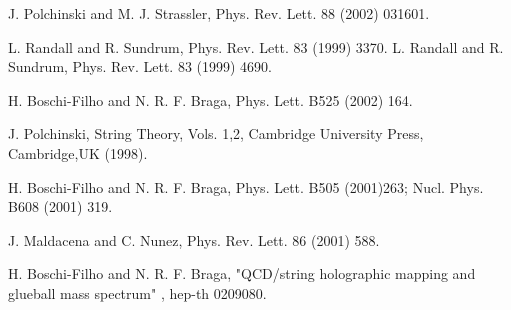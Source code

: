 \documentclass[a4paper,twocolumn,prd,groupedaddress,nofootinbib]{revtex4}
\begin{document}
\begin{thebibliography}{30}
 J. Polchinski and M. J. Strassler, Phys. Rev. Lett. 88 (2002) 031601.

 L. Randall and R. Sundrum, Phys. Rev. Lett. 83 (1999) 
3370.
 L. Randall and R. Sundrum, Phys. Rev. Lett. 83 (1999)
4690.

 H. Boschi-Filho and N. R. F. Braga, Phys. Lett. B525 (2002) 164.

 J. Polchinski, String Theory, Vols. 1,2, Cambridge University Press,
Cambridge,UK  (1998).

 H. Boschi-Filho and N. R. F. Braga, Phys. Lett. B505 (2001)263;
 Nucl. Phys. B608 (2001) 319.

 J. Maldacena and C. Nunez, Phys. Rev. Lett. 86 (2001) 588.

 H. Boschi-Filho and N. R. F. Braga, "QCD/string holographic 
mapping and glueball mass spectrum" , hep-th 0209080. 
 \end{thebibliography}
\end{document}
